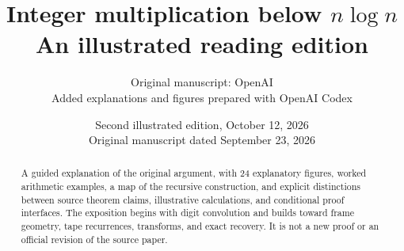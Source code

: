 \documentclass[11pt]{article}
\title{Integer multiplication below $n\log n$\\[8pt]\large An illustrated reading edition}
\author{Original manuscript: OpenAI\\[5pt]\small Added explanations and figures prepared with OpenAI Codex}
\date{Second illustrated edition, October 12, 2026\\\small Original manuscript dated September 23, 2026}
\theoremstyle{definition}
\begin{document}
\maketitle
\begin{abstract}
A guided explanation of the original argument, with 24 explanatory figures,
worked arithmetic examples, a map of the recursive construction, and explicit
distinctions between source theorem claims, illustrative calculations, and
conditional proof interfaces. The exposition begins with digit convolution
and builds toward frame geometry, tape recurrences, transforms, and exact
recovery. It is not a new proof or an official revision of the source paper.
\end{abstract}
\tableofcontents\clearpage





















\end{document}
